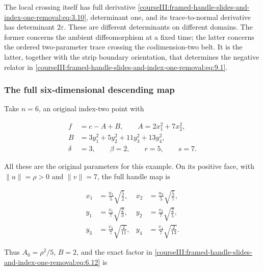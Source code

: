 The local crossing itself has full derivative \eqref{courseIII:framed-handle-slides-and-index-one-removal:eq:3.10}, determinant one, and its trace-to-normal derivative has determinant \(2\varepsilon\). These are different determinants on different domains. The former concerns the ambient diffeomorphism at a fixed time; the latter concerns the ordered two-parameter trace crossing the codimension-two belt. It is the latter, together with the strip boundary orientation, that determines the negative relator in \eqref{courseIII:framed-handle-slides-and-index-one-removal:eq:9.1}.

\subsubsection{The full six-dimensional descending map}
\label{courseIII:framed-handle-slides-and-index-one-removal:section-9.2}

\label{courseIII:low-index-slides:9.2}

Take \(n=6\), an original index-two point with

\begin{equation}
\begin{aligned}
 f&=c-A+B,\qquad
 A=2x_1^2+7x_2^2,\\
 B&=3y_1^2+5y_2^2+11y_3^2+13y_4^2,\\
 \delta&=3,\qquad\beta=2,\qquad r=5,\qquad s=7.
 \end{aligned}
 \label{courseIII:framed-handle-slides-and-index-one-removal:eq:9.3}
\end{equation}

All these are the original parameters for this example. On its positive face, with \(\|u\|=\rho>0\) and \(\|v\|=7\), the full handle map is

\begin{equation}
\begin{aligned}
 x_1&=\frac{u_1}{5}\sqrt{\frac{5}{2}},
 &x_2&=\frac{u_2}{5}\sqrt{\frac{5}{7}},\\
 y_1&=\frac{v_1}{7}\sqrt{\frac{2}{3}},
 &y_2&=\frac{v_2}{7}\sqrt{\frac{2}{5}},\\
 y_3&=\frac{v_3}{7}\sqrt{\frac{2}{11}},
 &y_4&=\frac{v_4}{7}\sqrt{\frac{2}{13}}.
 \end{aligned}
 \label{courseIII:framed-handle-slides-and-index-one-removal:eq:9.4}
\end{equation}

Thus \(A_0=\rho^2/5\), \(B=2\), and the exact factor in \eqref{courseIII:framed-handle-slides-and-index-one-removal:eq:6.12} is

